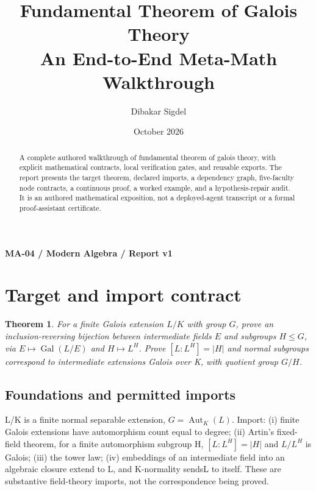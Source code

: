 \documentclass[preprint,12pt,aps,pra,showkeys,amsmath,amssymb,superscriptaddress,floatfix]{revtex4-2}
\newtheorem{theorem}{Theorem}[section]
\theoremstyle{definition}
\theoremstyle{remark}
\begin{document}
\title{Fundamental Theorem of Galois Theory\\[4pt]\large An End-to-End Meta-Math Walkthrough}

\author{Dibakar Sigdel}


\date{October 2026}

\begin{abstract}

A complete authored walkthrough of fundamental theorem of galois theory,
with explicit mathematical contracts, local verification gates, and
reusable exports. The report presents the target theorem, declared
imports, a dependency graph, five-faculty node contracts, a continuous
proof, a worked example, and a hypothesis-repair audit. It is an
authored mathematical exposition, not a deployed-agent transcript or a
formal proof-assistant certificate.

\end{abstract}\maketitle\linespread{1.12}\selectfont

\noindent\textbf{MA-04 / Modern Algebra / Report v1}

\section{Target and import contract}

\begin{theorem}

For a finite Galois extension \(L/K\) with group \(G\), prove an
inclusion-reversing bijection between intermediate fields \(E\) and
subgroups \(H\le G\), via \(E\mapsto\operatorname{Gal}(L/E)\) and
\(H\mapsto L^H\). Prove \([L:L^H]=|H|\) and normal subgroups correspond
to intermediate extensions Galois over K, with quotient group \(G/H\).

\end{theorem}

\subsection{Foundations and permitted imports}

L/K is a finite normal separable extension,
\(G=\operatorname{Aut} _K(L)\). Import: (i) finite Galois extensions
have automorphism count equal to degree; (ii) Artin's fixed-field
theorem, for a finite automorphism subgroup H, \([L:L^H]=|H|\) and
\(L/L^H\) is Galois; (iii) the tower law; (iv) embeddings of an
intermediate field into an algebraic closure extend to L, and
K-normality sendsL to itself. These are substantive field-theory
imports, not the correspondence being proved.
\end{document}
